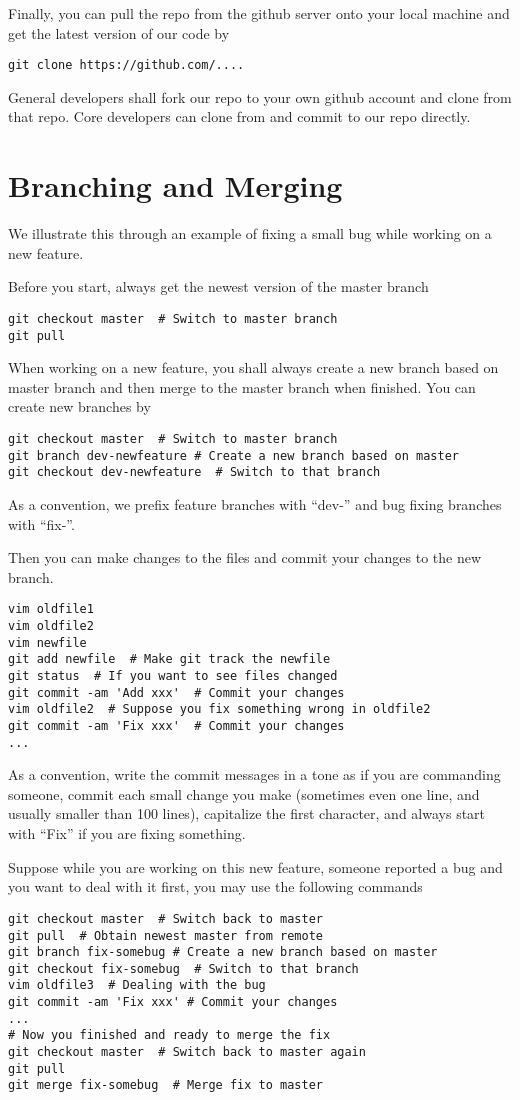 \documentclass[runningheads,letterpaper]{llncs}
\begin{document}
Finally, you can pull the repo from the github server onto your local machine and get the latest version of our code by
\begin{verbatim}
git clone https://github.com/....
\end{verbatim}
General developers shall fork our repo to your own github account and clone from that repo.
Core developers can clone from and commit to our repo directly.

\section{Branching and Merging}
\label{sec:basic}
We illustrate this through an example of fixing a small bug while working on a new feature.

Before you start, always get the newest version of the master branch
\begin{verbatim}
git checkout master  # Switch to master branch
git pull
\end{verbatim}

When working on a new feature, you shall always create a new branch based on master branch and then merge to the master branch when finished.
You can create new branches by
\begin{verbatim}
git checkout master  # Switch to master branch
git branch dev-newfeature # Create a new branch based on master
git checkout dev-newfeature  # Switch to that branch
\end{verbatim}
As a convention, we prefix feature branches with ``dev-'' and bug fixing branches with ``fix-''.

Then you can make changes to the files and commit your changes to the new branch.
\begin{verbatim}
vim oldfile1
vim oldfile2
vim newfile
git add newfile  # Make git track the newfile
git status  # If you want to see files changed
git commit -am 'Add xxx'  # Commit your changes
vim oldfile2  # Suppose you fix something wrong in oldfile2
git commit -am 'Fix xxx'  # Commit your changes
...
\end{verbatim}
As a convention,
write the commit messages in a tone as if you are commanding someone,
commit each small change you make (sometimes even one line, and usually smaller than 100 lines),
capitalize the first character,
and always start with ``Fix'' if you are fixing something.

Suppose while you are working on this new feature, someone reported a bug and you want to deal with it first, you may use the following commands
\begin{verbatim}
git checkout master  # Switch back to master
git pull  # Obtain newest master from remote
git branch fix-somebug # Create a new branch based on master
git checkout fix-somebug  # Switch to that branch
vim oldfile3  # Dealing with the bug
git commit -am 'Fix xxx' # Commit your changes
...
# Now you finished and ready to merge the fix
git checkout master  # Switch back to master again
git pull
git merge fix-somebug  # Merge fix to master
\end{verbatim}
\end{document}
